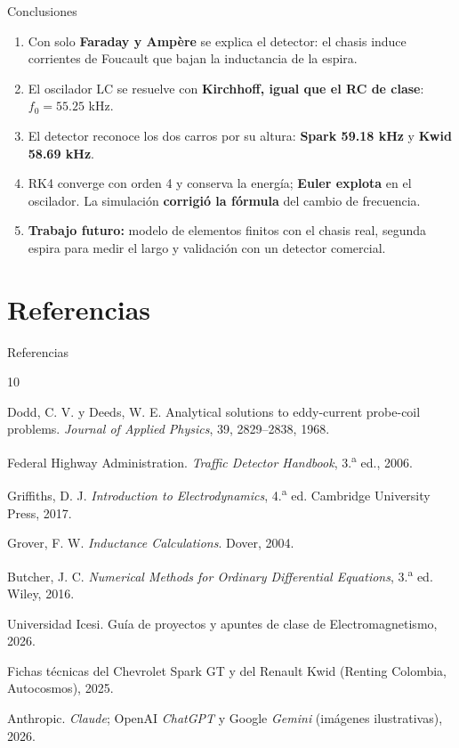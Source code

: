 \documentclass[aspectratio=169,10pt]{beamer}
\begin{document}
\begin{frame}{Conclusiones}

\begin{enumerate}
 \item Con solo \textbf{Faraday y Ampère} se explica el detector: el chasis induce corrientes de Foucault que bajan
       la inductancia de la espira.
 \item El oscilador LC se resuelve con \textbf{Kirchhoff, igual que el RC de clase}: $f_0 = 55.25$ kHz.
 \item El detector reconoce los dos carros por su altura: \textbf{Spark 59.18 kHz} y \textbf{Kwid 58.69 kHz}.
 \item RK4 converge con orden 4 y conserva la energía; \textbf{Euler explota} en el oscilador. La simulación
       \textbf{corrigió la fórmula} del cambio de frecuencia.
 \item \textbf{Trabajo futuro:} modelo de elementos finitos con el chasis real, segunda espira para medir el largo
       y validación con un detector comercial.
\end{enumerate}

\end{frame}


\section{Referencias}

\begin{frame}{Referencias}

\scriptsize

\begin{thebibliography}{10}

Dodd, C. V. y Deeds, W. E.
Analytical solutions to eddy-current probe-coil problems.
\textit{Journal of Applied Physics}, 39, 2829--2838, 1968.

Federal Highway Administration.
\textit{Traffic Detector Handbook}, 3.\textsuperscript{a} ed., 2006.

Griffiths, D. J.
\textit{Introduction to Electrodynamics}, 4.\textsuperscript{a} ed.
Cambridge University Press, 2017.

Grover, F. W.
\textit{Inductance Calculations}. Dover, 2004.

Butcher, J. C.
\textit{Numerical Methods for Ordinary Differential Equations}, 3.\textsuperscript{a} ed. Wiley, 2016.

Universidad Icesi. Guía de proyectos y apuntes de clase de Electromagnetismo, 2026.

Fichas técnicas del Chevrolet Spark GT y del Renault Kwid (Renting Colombia, Autocosmos), 2025.

Anthropic. \textit{Claude}; OpenAI \textit{ChatGPT} y Google \textit{Gemini} (imágenes ilustrativas), 2026.

\end{thebibliography}

\end{frame}
\end{document}
